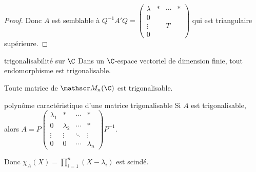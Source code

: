 \begin{proof}
    Donc $A$ est semblable à $Q^{-1} A' Q = \begin{pmatrix}
        \lambda & * & \cdots & * \\
        0 & & & \\
        \vdots & & T & \\
        0 & & &
    \end{pmatrix}$ qui est triangulaire supérieure.
\end{proof}

\begin{corollaire}{trigonalisabilité sur $\C$}{}
    Dans un $\C$-espace vectoriel de dimension finie, tout endomorphisme est trigonalisable.

    Toute matrice de $\mathscr M_n(\C)$ est trigonalisable.
\end{corollaire}


\begin{corollaire}{polynôme caractéristique d'une matrice trigonalisable}{}
    Si $A$ est trigonalisable, alors $A = P \begin{pmatrix}
        \lambda_1 & * & \cdots & * \\
        0 & \lambda_2 & \cdots & * \\
        \vdots & \vdots & \ddots & \vdots \\
        0 & 0 & \cdots & \lambda_n
    \end{pmatrix} P^{-1}$.

    Donc $\displaystyle \chi_A(X) = \prod_{i = 1 }^{ n } (X - \lambda_i)$ est scindé.
\end{corollaire}


